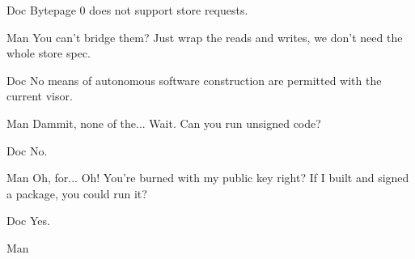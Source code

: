 \documentclass{screenplay}
\begin{document}
\begin{dialogue}{Doc}
Bytepage 0 does not support store requests.
\end{dialogue}
\begin{dialogue}{Man}
You can't bridge them?  Just wrap the reads and writes, we don't need the whole store spec.
\end{dialogue}
\begin{dialogue}{Doc}
No means of autonomous software construction are permitted with the current visor.
\end{dialogue}
\begin{dialogue}{Man}
Dammit, none of the...  Wait.  Can you run unsigned code?
\end{dialogue}
\begin{dialogue}{Doc}
No.
\begin{dialogue}{Man}
Oh, for...  Oh!  You're burned with my public key right?  If I built and signed a package, you could run it?
\end{dialogue}
\begin{dialogue}{Doc}
Yes.
\end{dialogue}
\begin{dialogue}{Man}


\end{dialogue}
\end{dialogue}
\end{document}

